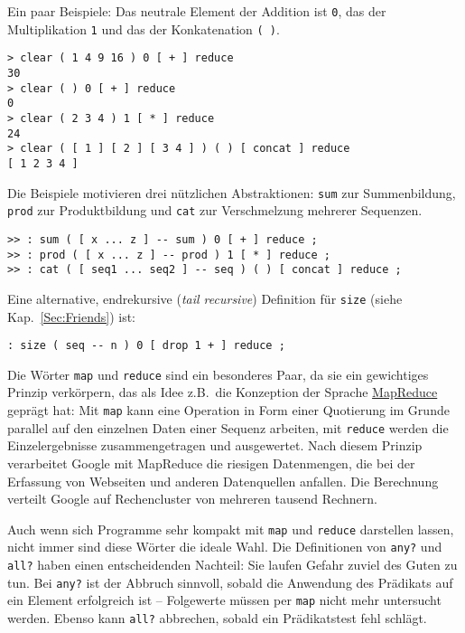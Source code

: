 Ein paar Beispiele: Das neutrale Element der Addition ist \verb|0|, das der Multiplikation \verb|1| und das der Konkatenation \verb|( )|.

\begin{verbatim}
> clear ( 1 4 9 16 ) 0 [ + ] reduce
30
> clear ( ) 0 [ + ] reduce
0
> clear ( 2 3 4 ) 1 [ * ] reduce
24
> clear ( [ 1 ] [ 2 ] [ 3 4 ] ) ( ) [ concat ] reduce
[ 1 2 3 4 ]
\end{verbatim}

Die Beispiele motivieren drei nützlichen Abstraktionen: \verb|sum| zur Summenbildung, \verb|prod| zur Produktbildung und \verb|cat| zur Verschmelzung mehrerer Sequenzen.

\begin{verbatim}
>> : sum ( [ x ... z ] -- sum ) 0 [ + ] reduce ;
>> : prod ( [ x ... z ] -- prod ) 1 [ * ] reduce ;
>> : cat ( [ seq1 ... seq2 ] -- seq ) ( ) [ concat ] reduce ;
\end{verbatim}

Eine alternative, endrekursive (\emph{tail recursive}) Definition für \verb|size| (siehe Kap.~\ref{Sec:Friends}) ist:

\begin{verbatim}
: size ( seq -- n ) 0 [ drop 1 + ] reduce ;
\end{verbatim}

Die Wörter \verb|map| und \verb|reduce| sind ein besonderes Paar, da sie ein gewichtiges Prinzip verkörpern, das als Idee z.B.\ die Konzeption der Sprache \href{http://de.wikipedia.org/wiki/MapReduce}{MapReduce} geprägt hat: Mit \verb|map| kann eine Operation in Form einer Quotierung im Grunde parallel auf den einzelnen Daten einer Sequenz arbeiten, mit \verb|reduce| werden die Einzelergebnisse zusammengetragen und ausgewertet. Nach diesem Prinzip verarbeitet Google mit MapReduce die riesigen Datenmengen, die bei der Erfassung von Webseiten und anderen Datenquellen anfallen. Die Berechnung verteilt Google auf Rechencluster von mehreren tausend Rechnern.

Auch wenn sich Programme sehr kompakt mit \verb|map| und \verb|reduce| darstellen lassen, nicht immer sind diese Wörter die ideale Wahl. Die Definitionen von \verb|any?| und \verb|all?| haben einen entscheidenden Nachteil: Sie laufen Gefahr zuviel des Guten zu tun. Bei \verb|any?| ist der Abbruch sinnvoll, sobald die Anwendung des Prädikats auf ein Element erfolgreich ist -- Folgewerte müssen per \verb|map| nicht mehr untersucht werden. Ebenso kann \verb|all?| abbrechen, sobald ein Prädikatstest fehl schlägt.

